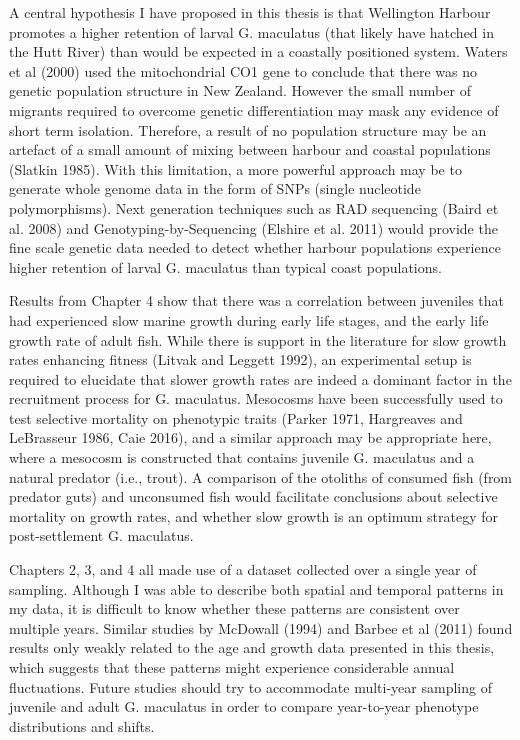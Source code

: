 \documentclass[]{book}
\begin{document}
A central hypothesis I have proposed in this thesis is that Wellington
Harbour promotes a higher retention of larval G. maculatus (that likely
have hatched in the Hutt River) than would be expected in a coastally
positioned system. Waters et al (2000) used the mitochondrial CO1 gene
to conclude that there was no genetic population structure in New
Zealand. However the small number of migrants required to overcome
genetic differentiation may mask any evidence of short term isolation.
Therefore, a result of no population structure may be an artefact of a
small amount of mixing between harbour and coastal populations (Slatkin
1985). With this limitation, a more powerful approach may be to generate
whole genome data in the form of SNPs (single nucleotide polymorphisms).
Next generation techniques such as RAD sequencing (Baird et al. 2008)
and Genotyping-by-Sequencing (Elshire et al. 2011) would provide the
fine scale genetic data needed to detect whether harbour populations
experience higher retention of larval G. maculatus than typical coast
populations.

Results from Chapter 4 show that there was a correlation between
juveniles that had experienced slow marine growth during early life
stages, and the early life growth rate of adult fish. While there is
support in the literature for slow growth rates enhancing fitness
(Litvak and Leggett 1992), an experimental setup is required to
elucidate that slower growth rates are indeed a dominant factor in the
recruitment process for G. maculatus. Mesocosms have been successfully
used to test selective mortality on phenotypic traits (Parker 1971,
Hargreaves and LeBrasseur 1986, Caie 2016), and a similar approach may
be appropriate here, where a mesocosm is constructed that contains
juvenile G. maculatus and a natural predator (i.e., trout). A comparison
of the otoliths of consumed fish (from predator guts) and unconsumed
fish would facilitate conclusions about selective mortality on growth
rates, and whether slow growth is an optimum strategy for
post-settlement G. maculatus.

Chapters 2, 3, and 4 all made use of a dataset collected over a single
year of sampling. Although I was able to describe both spatial and
temporal patterns in my data, it is difficult to know whether these
patterns are consistent over multiple years. Similar studies by McDowall
(1994) and Barbee et al (2011) found results only weakly related to the
age and growth data presented in this thesis, which suggests that these
patterns might experience considerable annual fluctuations. Future
studies should try to accommodate multi-year sampling of juvenile and
adult G. maculatus in order to compare year-to-year phenotype
distributions and shifts.
\end{document}
